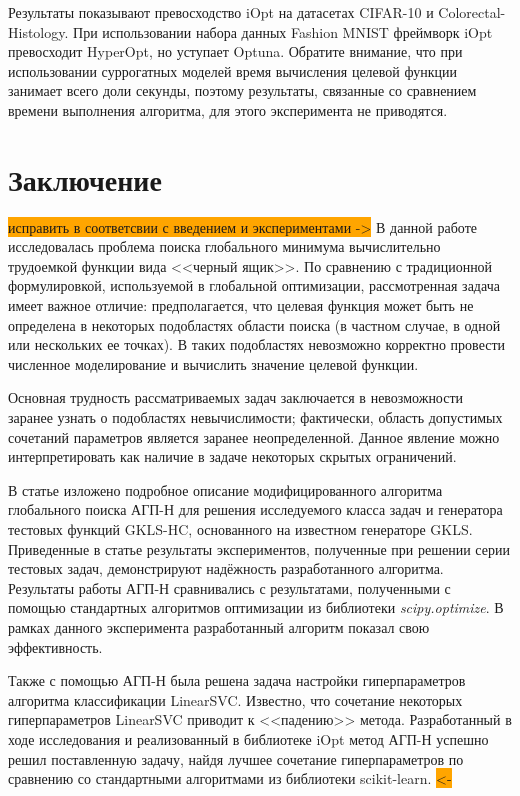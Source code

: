 \documentclass[a4paper,12pt,russian]{article}
\begin{document}
Результаты показывают превосходство iOpt на датасетах CIFAR-10 и Colorectal-Histology. При использовании набора данных Fashion MNIST фреймворк iOpt превосходит HyperOpt, но уступает Optuna. Обратите внимание, что при использовании суррогатных моделей время вычисления целевой функции занимает всего доли секунды, поэтому результаты, связанные со сравнением времени выполнения алгоритма, для этого эксперимента не приводятся.


\section{Заключение}

\colorbox{orange}{исправить в соответсвии с введением и экспериментами ->} В данной работе исследовалась проблема поиска глобального минимума вычислительно трудоемкой функции вида <<черный ящик>>. По сравнению с традиционной формулировкой, используемой в глобальной оптимизации, рассмотренная задача имеет важное отличие: предполагается, что целевая функция может быть не определена в некоторых подобластях области поиска (в частном случае, в одной или нескольких ее точках). В таких подобластях невозможно корректно провести численное моделирование и вычислить значение целевой функции.

Основная трудность рассматриваемых задач заключается в невозможности заранее узнать о подобластях невычислимости; фактически, область допустимых сочетаний параметров является заранее неопределенной. Данное явление можно интерпретировать как наличие в задаче некоторых скрытых ограничений.

В статье изложено подробное описание модифицированного алгоритма глобального поиска АГП-Н для решения исследуемого класса задач и генератора тестовых функций GKLS-HC, основанного на известном генераторе GKLS. Приведенные в статье результаты экспериментов, полученные при решении серии тестовых задач, демонстрируют надёжность разработанного алгоритма. Результаты работы АГП-Н сравнивались с результатами, полученными с помощью стандартных алгоритмов оптимизации из библиотеки \textit{scipy.optimize}. В рамках данного эксперимента разработанный алгоритм показал свою эффективность.

Также с помощью АГП-Н была решена задача настройки гиперпараметров алгоритма классификации LinearSVC. Известно, что сочетание некоторых гиперпараметров LinearSVC приводит к <<падению>> метода. Разработанный в ходе исследования и реализованный в библиотеке iOpt метод АГП-Н успешно решил поставленную задачу, найдя лучшее сочетание гиперпараметров по сравнению со стандартными алгоритмами из библиотеки scikit-learn. \colorbox{orange}{<-}
\end{document}

